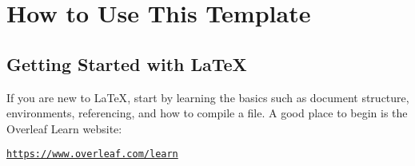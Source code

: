 \documentclass{VISTEC}
\begin{document}
 

\chapter*{How to Use This Template}
\label{manual}

\section{Getting Started with {\LaTeX}}
\label{manual:latex-getting-started}

\begin{paragraph}
If you are new to {\LaTeX}, start by learning the basics such as document structure, environments, referencing, and how to compile a file. A good place to begin is the Overleaf Learn website:
\end{paragraph}

\begin{center}
\href{https://www.overleaf.com/learn}{\texttt{https://www.overleaf.com/learn}}
\end{center}




\end{document}
